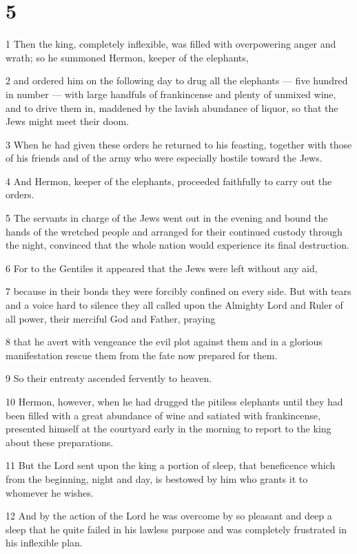 \chapter{5}

\par 1 Then the king, completely inflexible, was filled with overpowering anger and wrath; so he summoned Hermon, keeper of the elephants,
\par 2 and ordered him on the following day to drug all the elephants — five hundred in number — with large handfuls of frankincense and plenty of unmixed wine, and to drive them in, maddened by the lavish abundance of liquor, so that the Jews might meet their doom.
\par 3 When he had given these orders he returned to his feasting, together with those of his friends and of the army who were especially hostile toward the Jews.
\par 4 And Hermon, keeper of the elephants, proceeded faithfully to carry out the orders.
\par 5 The servants in charge of the Jews went out in the evening and bound the hands of the wretched people and arranged for their continued custody through the night, convinced that the whole nation would experience its final destruction.
\par 6 For to the Gentiles it appeared that the Jews were left without any aid,
\par 7 because in their bonds they were forcibly confined on every side. But with tears and a voice hard to silence they all called upon the Almighty Lord and Ruler of all power, their merciful God and Father, praying
\par 8 that he avert with vengeance the evil plot against them and in a glorious manifestation rescue them from the fate now prepared for them.
\par 9 So their entreaty ascended fervently to heaven.
\par 10 Hermon, however, when he had drugged the pitiless elephants until they had been filled with a great abundance of wine and satiated with frankincense, presented himself at the courtyard early in the morning to report to the king about these preparations.
\par 11 But the Lord sent upon the king a portion of sleep, that beneficence which from the beginning, night and day, is bestowed by him who grants it to whomever he wishes.
\par 12 And by the action of the Lord he was overcome by so pleasant and deep a sleep that he quite failed in his lawless purpose and was completely frustrated in his inflexible plan.
